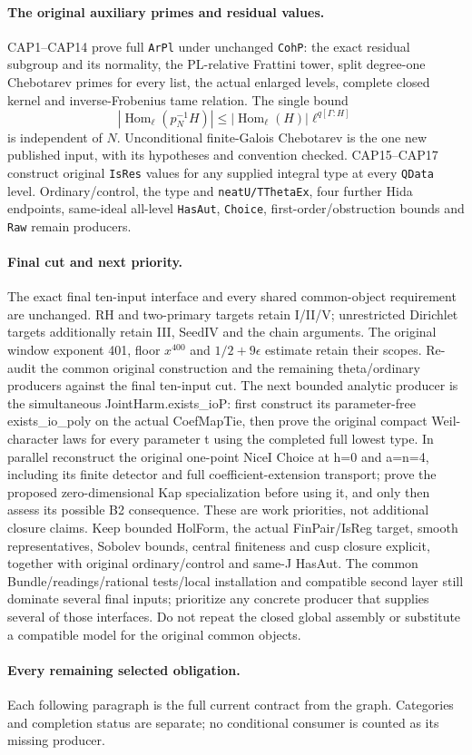 \paragraph{The original auxiliary primes and residual values.}
CAP1--CAP14 prove full \texttt{ArPl} under unchanged \texttt{CohP}:
the exact residual subgroup and its normality, the $\mathrm{PL}$-relative
Frattini tower, split degree-one Chebotarev primes for every list,
the actual enlarged levels, complete closed kernel and inverse-Frobenius
tame relation. The single bound
\[
 |\operatorname{Hom}_\ell(p_N^{-1}H)|
 \le |\operatorname{Hom}_\ell(H)|\ell^{q[\Gamma:H]}
\]
is independent of $N$. Unconditional finite-Galois Chebotarev is the
one new published input, with its hypotheses and convention checked.
CAP15--CAP17 construct original \texttt{IsRes} values for any supplied
integral type at every \texttt{QData} level.
Ordinary/control, the type and \texttt{neatU/TThetaEx}, four further
Hida endpoints, same-ideal all-level \texttt{HasAut}, \texttt{Choice},
first-order/obstruction bounds and \texttt{Raw} remain producers.

\paragraph{Final cut and next priority.}
The exact final ten-input interface and every shared common-object
requirement are unchanged. RH and two-primary targets retain I/II/V;
unrestricted Dirichlet targets additionally retain III, SeedIV and
the chain arguments. The original window exponent 401, floor
$x^{400}$ and $1/2+9\epsilon$ estimate retain their scopes.
Re-audit the common original construction and the remaining theta/ordinary producers against the final ten-input cut. The next bounded analytic producer is the simultaneous JointHarm.exists\_ioP: first construct its parameter-free exists\_io\_poly on the actual CoefMapTie, then prove the original compact Weil-character laws for every parameter t using the completed full lowest type. In parallel reconstruct the original one-point NiceI Choice at h=0 and a=n=4, including its finite detector and full coefficient-extension transport; prove the proposed zero-dimensional Kap specialization before using it, and only then assess its possible B2 consequence. These are work priorities, not additional closure claims. Keep bounded HolForm, the actual FinPair/IsReg target, smooth representatives, Sobolev bounds, central finiteness and cusp closure explicit, together with original ordinary/control and same-J HasAut. The common Bundle/readings/rational tests/local installation and compatible second layer still dominate several final inputs; prioritize any concrete producer that supplies several of those interfaces. Do not repeat the closed global assembly or substitute a compatible model for the original common objects.

\paragraph{Every remaining selected obligation.}
Each following paragraph is the full current contract from the graph.
Categories and completion status are separate; no conditional consumer
is counted as its missing producer.
